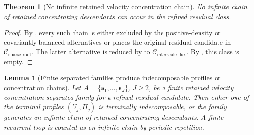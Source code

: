 \documentclass[11pt]{amsart}
\numberwithin{equation}{section}
\theoremstyle{plain}
\newtheorem{theorem}{Theorem}[section]
\newtheorem{lemma}[lemma]{Lemma}
\theoremstyle{definition}
\theoremstyle{remark}
\newcommand{\Csparse}{\mathcal C_{\mathrm{sparse\text{-}root}}}
\newcommand{\Cisf}{\mathcal C_{\mathrm{interscale\text{-}flux}}}
\begin{document}
\begin{theorem}[No infinite retained velocity concentration chain]
\label{thm:compact-active-descendant}
No infinite chain of retained concentrating descendants can occur in the
refined residual class.
\end{theorem}

\begin{proof}
By , every such chain is either
excluded by the positive-density or covariantly balanced alternatives or
places the original residual candidate in \(\Csparse\).  The latter
alternative is reduced by
 to \(\Cisf\).  By
, this class is empty.
\end{proof}

\begin{lemma}[Finite separated families produce indecomposable profiles or concentration chains]
\label{lem:finite-graph-cycle}
Let \(A=\{\mathfrak s_1,\dots,\mathfrak s_J\}\), \(J\ge2\), be a finite
retained velocity concentration separated family for a refined residual candidate.  Then either one of
the terminal profiles \((U_j,\Pi_j)\) is terminally indecomposable, or the
family generates an infinite chain of retained concentrating descendants.  A finite recurrent loop
is counted as an infinite chain by periodic repetition.
\end{lemma}
\end{document}
